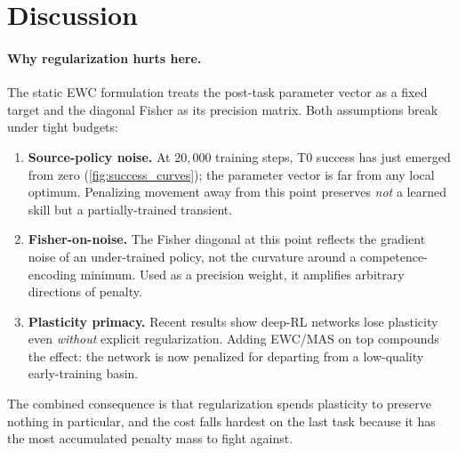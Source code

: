 \documentclass[11pt,a4paper]{article}
\begin{document}
\section{Discussion}
\label{sec:discussion}

\paragraph{Why regularization hurts here.} The static EWC formulation
\cite{kirkpatrick2017ewc} treats the post-task parameter vector as a fixed
target and the diagonal Fisher as its precision matrix. Both assumptions
break under tight budgets:
\begin{enumerate}[leftmargin=1.5em,topsep=2pt,itemsep=1pt]
    \item \textbf{Source-policy noise.} At $20{,}000$ training steps,
        T0 success has just emerged from zero (\cref{fig:success_curves});
        the parameter vector is far from any local optimum. Penalizing
        movement away from this point preserves \emph{not} a learned skill
        but a partially-trained transient.
    \item \textbf{Fisher-on-noise.} The Fisher diagonal at this point
        reflects the gradient noise of an under-trained policy, not the
        curvature around a competence-encoding minimum. Used as a precision
        weight, it amplifies arbitrary directions of penalty.
    \item \textbf{Plasticity primacy.} Recent results
        \cite{lyle2022plasticity,nikishin2022primacy} show deep-RL
        networks lose plasticity even \emph{without} explicit
        regularization. Adding EWC/MAS on top compounds the effect: the
        network is now penalized for departing from a low-quality
        early-training basin.
\end{enumerate}

The combined consequence is that regularization spends plasticity to
preserve nothing in particular, and the cost falls hardest on the last task
because it has the most accumulated penalty mass to fight against.
\end{document}
